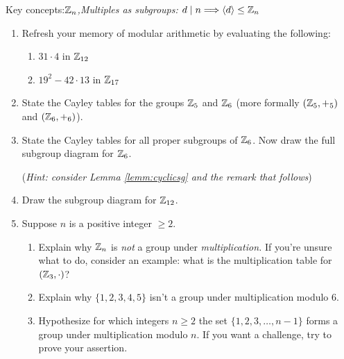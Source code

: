 \begin{exercises}
	Key concepts:\quad \emph{$\mathbb{Z}_n$,\quad Multiples as subgroups: $d\mid n\Longrightarrow \left\langle d\right\rangle\le\mathbb{Z}_n$}
	
	\begin{enumerate}
	  \item Refresh your memory of modular arithmetic by evaluating the following:
	  \begin{enumerate}
	    \item {}
	    	$31\cdot 4$ in $\mathbb{Z}_{12}$
	    	\setcounter{enumii}{2}
	    \item {}
	    	$19^2-42\cdot 13$ in $\mathbb{Z}_{17}$
	  \end{enumerate}
	  
	  \item State the Cayley tables for the groups $\mathbb{Z}_5$ and $\mathbb{Z}_6$ (more formally $(\mathbb{Z}_5,+_5)$ and $(\mathbb{Z}_6,+_6)$).
	  
	  \item State the Cayley tables for all proper subgroups of $\mathbb{Z}_6$. Now draw the full subgroup diagram for $\mathbb{Z}_6$.\par
	  (\emph{Hint: consider Lemma \ref{lemm:cyclicsg} and the remark that follows})
	  
	  \item Draw the subgroup diagram for $\mathbb{Z}_{12}$.
	  	  
	 	\item Suppose $n$ is a positive integer $\ge 2$.
	  \begin{enumerate}
	    \item Explain why $\mathbb{Z}_n$ is \emph{not} a group under \emph{multiplication.} If you're unsure what to do, consider an example: what is the multiplication table for $(\mathbb{Z}_3,\cdot)$?	  
	  	\item Explain why $\{1,2,3,4,5\}$ isn't a group under multiplication modulo 6.
	   	\item Hypothesize for which integers $n\ge 2$ the set $\{1,2,3,\ldots,n-1\}$ forms a group under multiplication modulo $n$. If you want a challenge, try to prove your assertion.
	  \end{enumerate}
	  	  

\end{enumerate}
\end{exercises}
